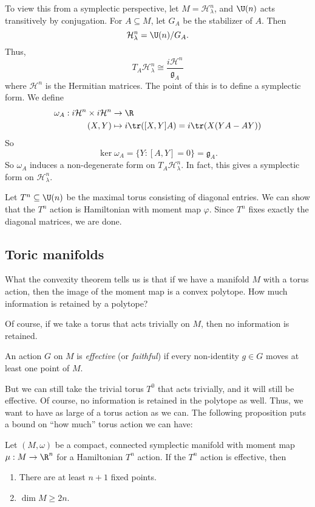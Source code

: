 \documentclass[a4paper]{article}
\begin{document}
To view this from a symplectic perspective, let $M = \mathcal{H}_\lambda^n$, and $\U(n)$ acts transitively by conjugation. For $A \subseteq M$, let $G_A$ be the stabilizer of $A$. Then
\[
  \mathcal{H}_\lambda^n = \U(n)/G_A.
\]
Thus,
\[
  T_A \mathcal{H}_\lambda^n \cong \frac{i \mathcal{H}^n}{\mathfrak{g}_A}
\]
where $\mathcal{H}^n$ is the Hermitian matrices. The point of this is to define a symplectic form. We define
\begin{align*}
  \omega_A : i \mathcal{H}^n \times i \mathcal{H}^n &\to \R\\
  (X, Y) &\mapsto i\tr([X, Y]A) = i \tr (X (YA - AY))
\end{align*}
So
\[
  \ker \omega_A = \{Y : [A, Y] = 0\} = \mathfrak{g}_A.
\]
So $\omega_A$ induces a non-degenerate form on $T_A \mathcal{H}_\lambda^n$. In fact, this gives a symplectic form on $\mathcal{H}^n_\lambda$.

Let $T^n \subseteq \U(n)$ be the maximal torus consisting of diagonal entries. We can show that the $T^n$ action is Hamiltonian with moment map $\varphi$. Since $T^n$ fixes exactly the diagonal matrices, we are done.

\subsection{Toric manifolds}
What the convexity theorem tells us is that if we have a manifold $M$ with a torus action, then the image of the moment map is a convex polytope. How much information is retained by a polytope?

Of course, if we take a torus that acts trivially on $M$, then no information is retained.

\begin{defi}
  An action $G$ on $M$ is \emph{effective} (or \emph{faithful}) if every non-identity $g \in G$ moves at least one point of $M$.
\end{defi}

But we can still take the trivial torus $T^0$ that acts trivially, and it will still be effective. Of course, no information is retained in the polytope as well. Thus, we want to have as large of a torus action as we can. The following proposition puts a bound on ``how much'' torus action we can have:
\begin{prop}
  Let $(M, \omega)$ be a compact, connected symplectic manifold with moment map $\mu: M \to \R^n$ for a Hamiltonian $T^n$ action. If the $T^n$ action is effective, then
  \begin{enumerate}
    \item There are at least $n + 1$ fixed points.
    \item $\dim M \geq 2n$.
  \end{enumerate}
\end{prop}
\end{document}

